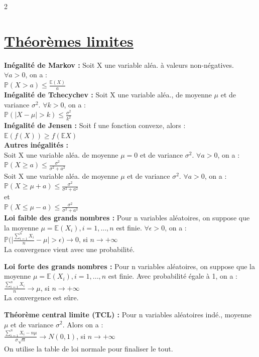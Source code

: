 \documentclass[11pt]{article}
\begin{document}
\begin{multicols}{2}
  \section{\underline{Théorèmes limites}}

  \textbf{Inégalité de Markov :}
  Soit X une variable aléa. à valeurs non-négatives. $\forall a>0$, on a :\\
  $\mathbb{P}(X>a)\leq \frac{\mathbb{E}(X)}{a}$\\

  \textbf{Inégalité de Tchecychev :}
  Soit X une variable aléa., de moyenne $\mu$ et de variance $\sigma^2$. $\forall k>0$, on a :\\
  $\mathbb{P}(|X-\mu|>k)\leq \frac{\sigma^2}{k^2}$\\

  \textbf{Inégalité de Jensen :}
  Soit f une fonction convexe, alors :\\
  $\mathbb{E}(f(X))\geq f(\mathbb{E}X)$\\

  \textbf{Autres inégalités :}\\
  Soit X une variable aléa. de moyenne \underline{$\mu=0$} et de variance $\sigma^2$. $\forall a>0$, on a :\\
  $\mathbb{P}(X \geq a)\leq \frac{\sigma^2}{\sigma^2 + a^2}$\\
  Soit X une variable aléa. de moyenne \underline{$\mu$}  et de variance $\sigma^2$. $\forall a>0$, on a :\\
  $\mathbb{P}(X\geq \mu +a)\leq \frac{\sigma^2}{\sigma^2 + a^2}$\\
  et\\
  $\mathbb{P}(X\leq \mu -a)\leq \frac{\sigma^2}{\sigma^2 + a^2}$\\

  \textbf{Loi faible des grands nombres :}
  Pour n variables aléatoires, on suppose que la moyenne $\mu = \mathbb{E}(X_i), i=1,... ,n$ est finie. $\forall\epsilon >0$, on a :\\
  $\mathbb{P}\bigg(\bigg|\frac{\sum_{i=1}^{n}X_i}{n}-\mu\bigg|>\epsilon\bigg)\rightarrow 0$, si $n\rightarrow +\infty$\\
  La convergence vient avec une probabilité.

  \textbf{Loi forte des grands nombres :}
  Pour n variables aléatoires, on suppose que la moyenne $\mu = \mathbb{E}(X_i), i=1,... ,n$ est finie. Avec probabilité égale à 1, on a :\\
  $\frac{\sum_{i=1}^{n}X_i}{n}\rightarrow\mu$, si $n\rightarrow +\infty$\\
  La convergence est sûre.

  \textbf{Théorème central limite (TCL) :}
  Pour n variables aléatoires indé., moyenne $\mu$ et de variance $\sigma^2$. Alors on a :\\
  $\frac{\sum_{i=1}^{n}X_i-n\mu}{\sigma\sqrt{n}}\rightarrow N(0,1)$, si $n\rightarrow +\infty$\\
  On utilise la table de loi normale pour finaliser le tout.
\end{multicols}
\end{document}
